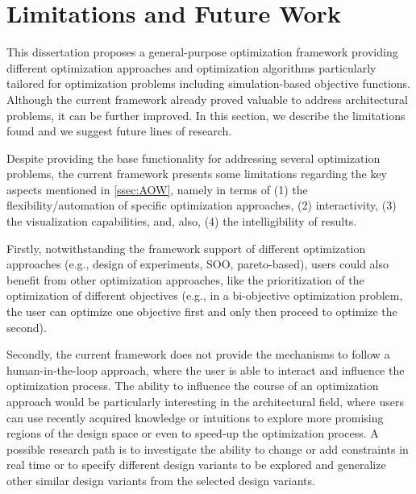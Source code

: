 \section{Limitations and Future Work}

This dissertation proposes a general-purpose optimization framework providing different optimization approaches and optimization algorithms particularly tailored for optimization problems including simulation-based objective functions. Although the current framework already proved valuable to address architectural problems, it can be further improved. In this section, we describe the limitations found and we suggest future lines of research.

Despite providing the base functionality for addressing several optimization problems, the current framework presents some limitations regarding the key aspects mentioned in \cref{ssec:AOW}, namely in terms of (1) the flexibility/automation of specific optimization approaches, (2) interactivity, (3) the visualization capabilities, and, also, (4) the intelligibility of results.

Firstly, notwithstanding the framework support of different optimization approaches (e.g., design of experiments, \ac{SOO}, pareto-based), users could also benefit from other optimization approaches, like the prioritization of the optimization of different objectives (e.g., in a bi-objective optimization problem, the user can optimize one objective first and only then proceed to optimize the second). 

Secondly, the current framework does not provide the mechanisms to follow a human-in-the-loop approach, where the user is able to interact and influence the optimization process. The ability to influence the course of an optimization approach would be particularly interesting in the architectural field, where users can use recently acquired knowledge or intuitions to explore more promising regions of the design space or even to speed-up the optimization process. A possible research path is to investigate the ability to change or add constraints in real time or to specify different design variants to be explored and generalize other similar design variants from the selected design variants.

